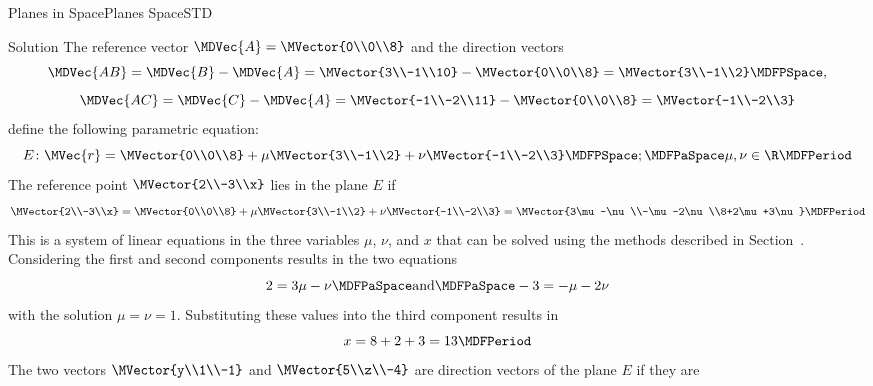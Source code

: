\begin{MXContent}{Planes in Space}{Planes Space}{STD}
\begin{MExercise}
\begin{MHint}{Solution}
The reference vector $\MDVec{A}=\MVector{0\\0\\8}$ and the direction vectors 
\[
 \MDVec{A B}=\MDVec{B}-\MDVec{A}=\MVector{3\\-1\\10}-\MVector{0\\0\\8}=\MVector{3\\-1\\2} \MDFPSpace,
\]
\[
 \MDVec{A C}=\MDVec{C}-\MDVec{A}=\MVector{-1\\-2\\11}-\MVector{0\\0\\8}=\MVector{-1\\-2\\3}
\]
define the following parametric equation:
\[
 E\colon\MVec{r}=\MVector{0\\0\\8}+\mu\MVector{3\\-1\\2}+\nu\MVector{-1\\-2\\3}\MDFPSpace;\MDFPaSpace \mu,\nu\in\R\MDFPeriod
\]
The reference point $\MVector{2\\-3\\x}$ lies in the plane $E$ if
\[
 \MVector{2\\-3\\x}=\MVector{0\\0\\8}+\mu\MVector{3\\-1\\2}+\nu\MVector{-1\\-2\\3}=\MVector{3\mu-\nu\\-\mu-2\nu\\8+2\mu+3\nu}\MDFPeriod
\]
This is a system of linear equations in the three variables $\mu$, $\nu$, and $x$ that can be solved using the methods
described in Section~. Considering the first and second components results in the two equations
\[
 2=3\mu-\nu\MDFPaSpace\textrm{and}\MDFPaSpace -3=-\mu-2\nu 
\]
with the solution $\mu=\nu=1$. Substituting these values into the third component results in
\[
 x=8+2+3=13 \MDFPeriod
\]
The two vectors $\MVector{y\\1\\-1}$ and $\MVector{5\\z\\-4}$ are direction vectors of the plane $E$ if they are 

\end{MHint}
\end{MExercise}
\end{MXContent}
